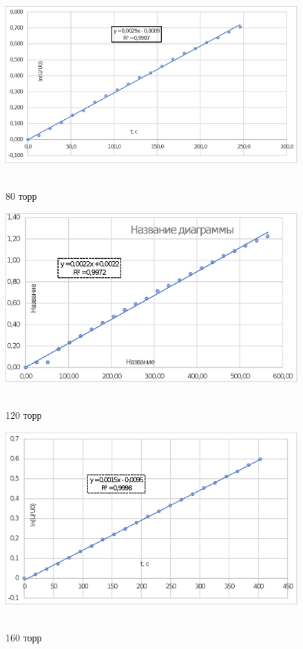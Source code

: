 \documentclass[a4paper,12pt]{article}
\theoremstyle{plain} %
\theoremstyle{definition} %
\theoremstyle{remark} %
\begin{document}
\begin{figure}[H]
{\includegraphics[width=0.7\linewidth]{graph2.eps}}\ 
\caption{80 торр}
\end{figure}

\begin{figure}[H]
{\includegraphics[width=0.7\linewidth]{graph3.eps}}\ 
\caption{120 торр}
\end{figure}

\begin{figure}[H]
{\includegraphics[width=0.7\linewidth]{graph4.eps}}\ 
\caption{160 торр}
\end{figure}
\end{document}
